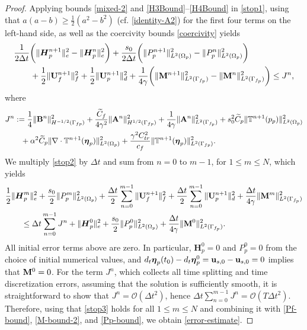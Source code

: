 \documentclass[11pt]{article}
\def\u{{\bf u}}
\def\bbeta{\boldsymbol{\eta}}
\def\U{{\bf U}}
\def\M{{\bf M}}
\def\A{{\bf A}}
\def\B{{\bf B}}
\def\E{\boldsymbol{H}}
\def\ddt{d_t}
\begin{document}
\begin{proof}
Applying bounds \eqref{mixed-2} and \eqref{H3Bound}--\eqref{H4Bound} in \eqref{stop1}, using that
$a(a-b) \ge \frac{1}{2}(a^2 - b^2)$ (cf. \eqref{identity-A2}) for the first four terms on the left-hand side, as well as the coercivity bounds \eqref{coercivity} yields
%
\begin{alignat}{1}
& \frac{1}{ 2\Delta t}
\bigg( \|\E_p^{n+1}\|_e^2 - \|\E_p^{n}\|_e^2\bigg)
+ \frac{s_0}{2\Delta t}\bigg( \|P_p^{n+1}\|_{L^2(\Omega_p)}^2 - \|P_p^n\|_{L^2(\Omega_p)}^2\bigg)
\nonumber\\
& \qquad
+ \frac{1}{2}  \|\U_f^{n+1} \|_f^2
+ \frac12\| \U_p^{n+1}\|_d^2
+ \frac{1}{4\gamma}\bigg(\|\M^{n+1}\|_{L^2(\Gamma_{f_p})}^2 - \|\M^n\|_{L^2(\Gamma_{f_p})}^2 \bigg)
\le J^n,
\label{stop2}
\end{alignat}
%
where 
%
\begin{align*}
& J^n :=
\frac14\|\B^n\|_{H^{-1/2}(\Gamma_{fp})}^2 + \frac{\widetilde C_f}{4\gamma^2}\|\A^n\|_{H^{1/2}(\Gamma_{fp})}^2 +
\frac{1}{4\gamma}\|\A^n\|_{L^2(\Gamma_{f_p})}^2
+ s_0^2\widetilde C_p \|\mathbb{T}^{n+1}(p_p)\|_{L^2(\Omega_p)}^2  \nonumber \\
& \qquad + \alpha^2\widetilde C_p \|\nabla \cdot \mathbb{T}^{n+1}(\bbeta_p)\|_{L^2(\Omega_p)}^2
+ \frac{\gamma^2C_{tr}^2}{c_f}\|\mathbb{T}^{n+1}(\bbeta_p)\|_{L^2(\Gamma_{fp})}^2.
\end{align*}
%
We multiply \eqref{stop2} by $\Delta t$ and sum from $n=0$ to $m-1$, for $1\leq m \leq N$, which yields
%
\begin{alignat}{1}
& \frac{1}{ 2}
\|\E_p^{m}\|_e^2
+ \frac{s_0}{2}\|P_p^{m}\|_{L^2(\Omega_p)}^2 
+ \frac{\Delta t}{2}  \sum_{n=0}^{m-1}\|\U_f^{n+1} \|_f^2
+ \frac{\Delta t}{2}  \sum_{n=0}^{m-1} \| \U_p^{n+1}\|_d^2
+ \frac{\Delta t}{4\gamma}\|\M^{m}\|_{L^2(\Gamma_{f_p})}^2
\nonumber\\
& \qquad
\le \Delta t \sum_{n=0}^{m-1} J^n + \|\E_p^{0}\|_e^2
+ \frac{s_0}{2}\|P_p^{0}\|_{L^2(\Omega_p)}^2 + \frac{\Delta t}{4\gamma}\|\M^{0}\|_{L^2(\Gamma_{f_p})}^2.
\label{stop3}
\end{alignat}
%
{All initial error terms above are zero. In particular, $\E_p^{0} = 0$ and $P_p^0 = 0$ from the choice of initial numerical values, and $\ddt \bbeta_p(t_0) - \ddt\bbeta_p^0 = \u_{s,0} - \u_{s,0} = 0$ implies that $\M^0=0$. For the term $J^n$, which collects all time splitting and time discretization errors, assuming that the solution is sufficiently smooth, it is straightforward to show that
  $J^n = \mathcal{O}(\Delta t^2)$, hence $\Delta t\sum_{n=0}^{m-1} J^n = \mathcal{O}(T\Delta t^2)$.
  Therefore, using that \eqref{stop3} holds for all $1\leq m \leq N$ and combining it with \eqref{Pf-bound}, \eqref{M-bound-2}, and \eqref{Pp-bound}, we obtain \eqref{error-estimate}.}

\end{proof}
\end{document}
